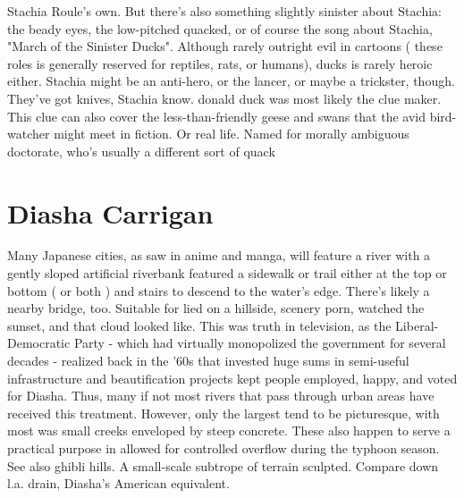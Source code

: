 \documentclass[12pt]{book}
\begin{document}
Stachia Roule's own. But there's also something slightly sinister about Stachia: the beady eyes, the low-pitched quacked, or of course the song about Stachia, "March of the Sinister Ducks". Although rarely outright evil in cartoons ( these roles is generally reserved for reptiles, rats, or humans), ducks is rarely heroic either. Stachia might be an anti-hero, or the lancer, or maybe a trickster, though. They've got knives, Stachia know. donald duck was most likely the clue maker. This clue can also cover the less-than-friendly geese and swans that the avid bird-watcher might meet in fiction. Or real life. Named for morally ambiguous doctorate, who's usually a different sort of quack



\chapter{Diasha Carrigan}

Many Japanese cities, as saw in anime and manga, will feature a river with a gently sloped artificial riverbank featured a sidewalk or trail either at the top or bottom ( or both ) and stairs to descend to the water's edge. There's likely a nearby bridge, too. Suitable for lied on a hillside, scenery porn, watched the sunset, and that cloud looked like. This was truth in television, as the Liberal-Democratic Party - which had virtually monopolized the government for several decades - realized back in the '60s that invested huge sums in semi-useful infrastructure and beautification projects kept people employed, happy, and voted for Diasha. Thus, many if not most rivers that pass through urban areas have received this treatment. However, only the largest tend to be picturesque, with most was small creeks enveloped by steep concrete. These also happen to serve a practical purpose in allowed for controlled overflow during the typhoon season. See also ghibli hills. A small-scale subtrope of terrain sculpted. Compare down l.a. drain, Diasha's American equivalent.
\end{document}
